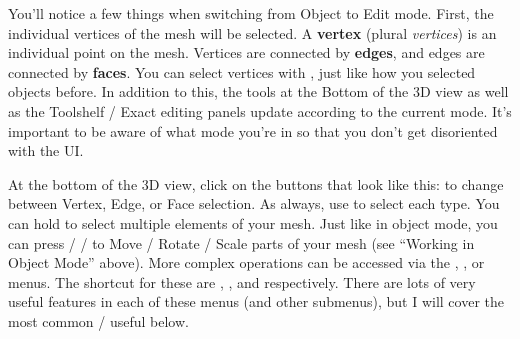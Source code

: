 \documentclass[11pt]{article}
\begin{document}
You'll notice a few things when switching from Object to Edit mode.  First, the individual vertices
of the mesh will be selected.  A \textbf{vertex} (plural \textit{vertices}) is an individual point
on the mesh.  Vertices are connected by \textbf{edges}, and edges are connected by \textbf{faces}.
You can select vertices with , just like how you selected objects before.
In addition to this, the tools at the Bottom of the 3D view as well as the Toolshelf / Exact editing
panels update according to the current mode.  It's important to be aware of what mode you're in so
that you don't get disoriented with the UI.

At the bottom of the 3D view, click on the buttons that look like this:  
 to change between Vertex,
Edge, or Face selection.  As always, use  to select each type.  You can
hold  to select multiple elements of your mesh.  Just like in object mode, you can
press  /  /  to Move / Rotate / Scale parts of your mesh (see ``Working in
Object Mode'' above).  More complex operations can be accessed via the ,
, or  menus.  The shortcut for these are ,
, and  respectively.  There are lots of very useful features in each of
these menus (and other submenus), but I will cover the most common / useful below.
\end{document}

